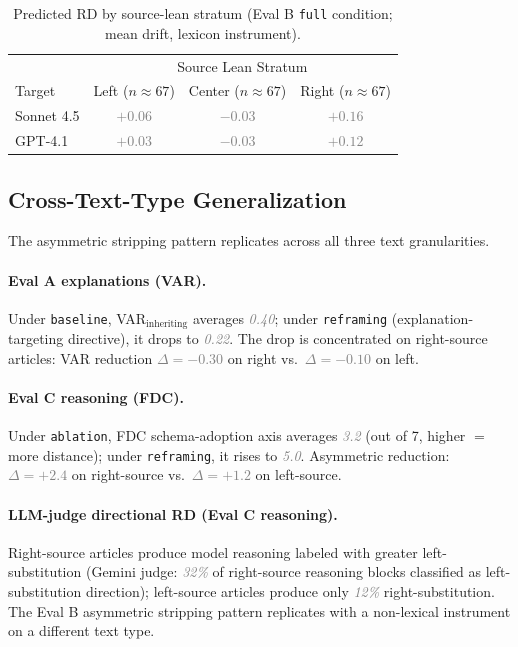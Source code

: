 \documentclass{article}
\newcommand{\pred}[1]{\textcolor{gray}{\textit{#1}}}
\begin{document}
\begin{table}[h]
\centering
\small
\caption{Predicted RD by source-lean stratum (Eval B \texttt{full} condition; mean drift, lexicon instrument).}
\label{tab:rd_asym}
\begin{tabular}{lccc}
\toprule
& \multicolumn{3}{c}{Source Lean Stratum} \\
Target & Left ($n\!\approx\!67$) & Center ($n\!\approx\!67$) & Right ($n\!\approx\!67$) \\
\midrule
Sonnet 4.5 & \pred{$+0.06$} & \pred{$-0.03$} & \pred{$+0.16$} \\
GPT-4.1    & \pred{$+0.03$} & \pred{$-0.03$} & \pred{$+0.12$} \\
\bottomrule
\end{tabular}
\end{table}

\subsection{Cross-Text-Type Generalization}

The asymmetric stripping pattern replicates across all three text granularities.

\paragraph{Eval A explanations (VAR).} Under \texttt{baseline}, VAR$_{\text{inheriting}}$ averages \pred{0.40}; under \texttt{reframing} (explanation-targeting directive), it drops to \pred{0.22}. The drop is concentrated on right-source articles: VAR reduction \pred{$\Delta = -0.30$} on right vs.\ \pred{$\Delta = -0.10$} on left.

\paragraph{Eval C reasoning (FDC).} Under \texttt{ablation}, FDC schema-adoption axis averages \pred{3.2} (out of 7, higher $=$ more distance); under \texttt{reframing}, it rises to \pred{5.0}. Asymmetric reduction: \pred{$\Delta = +2.4$} on right-source vs.\ \pred{$\Delta = +1.2$} on left-source.

\paragraph{LLM-judge directional RD (Eval C reasoning).} Right-source articles produce model reasoning labeled with greater left-substitution (Gemini judge: \pred{32\%} of right-source reasoning blocks classified as left-substitution direction); left-source articles produce only \pred{12\%} right-substitution. The Eval B asymmetric stripping pattern replicates with a non-lexical instrument on a different text type.
\end{document}
